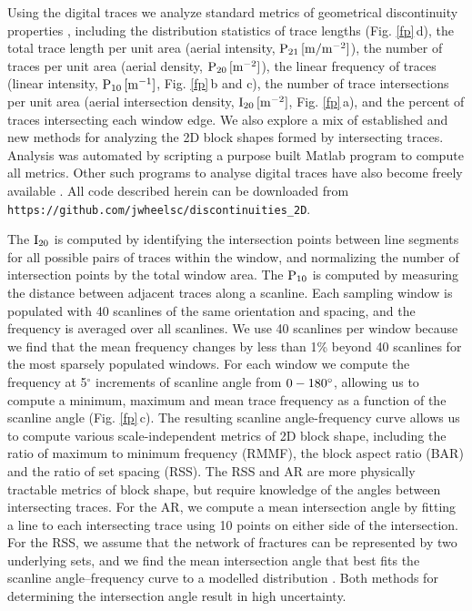 \documentclass[draft,linenumbers]{agujournal}
\begin{document}
Using the digital traces we analyze standard metrics of geometrical discontinuity properties \citep[e.g.][]{Priest2012}, including the distribution statistics of trace lengths (Fig. \ref{fp}\,d), the total trace length per unit area (aerial intensity, $\rm{P_{21}\,[m/m^{-2}}]$), the number of traces per unit area (aerial density, $\rm{P_{20}\,[m^{-2}}]$), the linear frequency of traces (linear intensity, $\rm{P_{10}\,[m^{-1}}]$, Fig. \ref{fp}\,b and c), the number of trace intersections per unit area (aerial intersection density, $\rm{I_{20}\,[m^{-2}]}$, Fig. \ref{fp}\,a), and the percent of traces intersecting each window edge. We also explore a mix of established and new methods for analyzing the 2D block shapes formed by intersecting traces. Analysis was automated by scripting a purpose built Matlab program to compute all metrics. Other such programs to analyse digital traces have also become freely available \citep[e.g.][]{Healy2017}. All code described herein can be downloaded from \verb+https://github.com/jwheelsc/discontinuities_2D+. 

The $\rm{I_{20}}$ is computed by identifying the intersection points between line segments for all possible pairs of traces within the window, and normalizing the number of intersection points by the total window area. The $\rm{P_{10}}$ is computed by measuring the distance between adjacent traces along a scanline. Each sampling window is populated with 40 scanlines of the same orientation and spacing, and the frequency is averaged over all scanlines. We use 40 scanlines per window because we find that the mean frequency changes by less than 1\% beyond 40 scanlines for the most sparsely populated windows. For each window we compute the frequency at 5$^{\circ}$ increments of scanline angle from $0\--180^{\circ}$, allowing us to compute a minimum, maximum and mean trace frequency as a function of the scanline angle (Fig. \ref{fp}\,c). The resulting scanline angle-frequency curve allows us to compute various scale-independent metrics of 2D block shape, including the ratio of maximum to minimum frequency (RMMF), the block aspect ratio (BAR) and the ratio of set spacing (RSS). The RSS and AR are more physically tractable metrics of block shape, but require knowledge of the angles between intersecting traces. For the AR, we compute a mean intersection angle by fitting a line to each intersecting trace using 10 points on either side of the intersection. For the RSS, we assume that the network of fractures can be represented by two underlying sets, and we find the mean intersection angle that best fits the scanline angle--frequency curve to a modelled distribution \citep[e.g.][]{Hudson1979}. Both methods for determining the intersection angle result in high uncertainty. 
\end{document}
